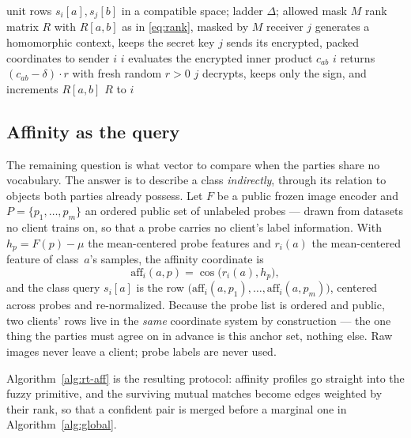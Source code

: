 \documentclass[conference]{IEEEtran}
\newcommand{\FuzzyPSI}{\textsc{FuzzyPSI}}
\newcommand{\aff}{\mathrm{aff}}
\begin{document}
\begin{algorithm}[t]
\caption{$\FuzzyPSI(s_i,s_j,\Delta,M)$ (primitive, abstract)}
\label{alg:fpsi}
\begin{algorithmic}[1]
\Require unit rows $s_i[a],s_j[b]$ in a compatible space; ladder $\Delta$; allowed mask $M$
\Ensure rank matrix $R$ with $R[a,b]$ as in \eqref{eq:rank}, masked by $M$
  \State receiver $j$ generates a homomorphic context, keeps the secret key
  \State $j$ sends its encrypted, packed coordinates to sender $i$
    \State $i$ evaluates the encrypted inner product $c_{ab}$
    \State $i$ returns $(c_{ab}-\delta)\cdot r$ with fresh random $r>0$
    \State $j$ decrypts, keeps only the sign, and increments $R[a,b]$
  \EndFor
  \State \Return $R$ to $i$
  \Statex {}
\end{algorithmic}
\end{algorithm}

\subsection{Affinity as the query}
The remaining question is what vector to compare when the parties share
no vocabulary. The answer is to describe a class \emph{indirectly},
through its relation to objects both parties already possess. Let $F$ be
a public frozen image encoder and $P=\{p_1,\dots,p_m\}$ an ordered
public set of unlabeled probes --- drawn from datasets no client trains
on, so that a probe carries no client's label information. With
$h_p=F(p)-\mu$ the mean-centered probe features and $r_i(a)$ the
mean-centered feature of class~$a$'s samples, the affinity coordinate is
\begin{equation}
\aff_i(a,p)=\cos\!\big(r_i(a),h_p\big),
\end{equation}
and the class query $s_i[a]$ is the row
$\big(\aff_i(a,p_1),\dots,\aff_i(a,p_m)\big)$, centered across probes
and re-normalized. Because the probe list is ordered and public, two
clients' rows live in the \emph{same} coordinate system by
construction --- the one thing the parties must agree on in advance is
this anchor set, nothing else. Raw images never leave a client; probe
labels are never used.

Algorithm~\ref{alg:rt-aff} is the resulting protocol: affinity profiles
go straight into the fuzzy primitive, and the surviving mutual matches
become edges weighted by their rank, so that a confident pair is merged
before a marginal one in Algorithm~\ref{alg:global}.
\end{document}
